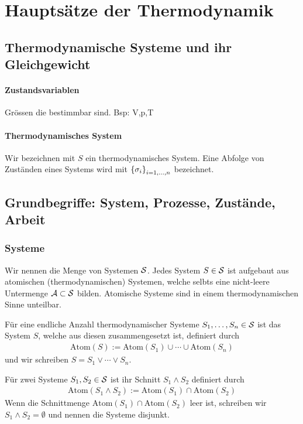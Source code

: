 \section{Hauptsätze der Thermodynamik}

\subsection{Thermodynamische Systeme und ihr Gleichgewicht}

\paragraph{Zustandsvariablen}
Grössen die bestimmbar sind. Bsp: V,p,T

\paragraph{Thermodynamisches System}
Wir bezeichnen mit $S$ ein thermodynamisches System. Eine Abfolge von
Zuständen eines Systems wird mit $\geschwungeneklammer{\sigma_i}_{i=1,\dots,n}$
bezeichnet.

\subsection{Grundbegriffe: System, Prozesse, Zustände, Arbeit}

\subsubsection{Systeme}
Wir nennen die Menge von Systemen $\S$. Jedes System $S \in \S$ ist
aufgebaut aus atomischen (thermodynamischen) Systemen, welche selbts eine
nicht-leere Untermenge $\A \subset \S$ bilden. Atomische Systeme sind in
einem thermodynamischen Sinne unteilbar.

\begin{definition}
    Für eine endliche Anzahl thermodynamischer Systeme $S_1,\dots,S_n \in \S$
    ist das System $S$, welche aus diesen zusammengesetzt ist, definiert
    durch
    \begin{align*}
        \text{Atom}(S) := \text{Atom}(S_1) \cup \dotsb \cup \text{Atom}(S_n)
    \end{align*}
    und wir schreiben $S = S_1 \vee \dotsb \vee S_n$.
\end{definition}

\begin{definition}
    Für zwei Systeme $S_1,S_2 \in \S$ ist ihr Schnitt $S_1 \wedge S_2$
    definiert durch
    \begin{align*}
        \text{Atom}(S_1 \wedge S_2) := \text{Atom}(S_1) \cap \text{Atom}(S_2)
    \end{align*}
    Wenn die Schnittmenge $\text{Atom}(S_1) \cap \text{Atom}(S_2)$ leer ist, schreiben
    wir $S_1 \wedge S_2 = \emptyset$ und nennen die Systeme disjunkt.
\end{definition}

